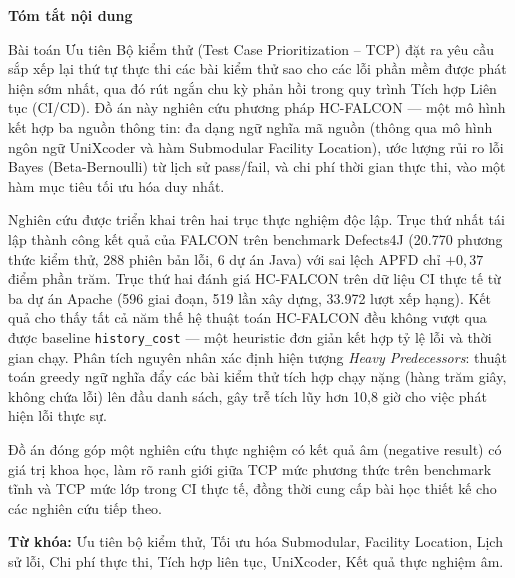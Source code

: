 
\begin{center}
    \Large{\textbf{Tóm tắt nội dung}}
\end{center}
\vspace{0.5cm}

Bài toán Ưu tiên Bộ kiểm thử (Test Case Prioritization -- TCP) đặt ra yêu cầu sắp xếp lại thứ tự thực thi các bài kiểm thử sao cho các lỗi phần mềm được phát hiện sớm nhất, qua đó rút ngắn chu kỳ phản hồi trong quy trình Tích hợp Liên tục (CI/CD). Đồ án này nghiên cứu phương pháp HC-FALCON --- một mô hình kết hợp ba nguồn thông tin: đa dạng ngữ nghĩa mã nguồn (thông qua mô hình ngôn ngữ UniXcoder và hàm Submodular Facility Location), ước lượng rủi ro lỗi Bayes (Beta-Bernoulli) từ lịch sử pass/fail, và chi phí thời gian thực thi, vào một hàm mục tiêu tối ưu hóa duy nhất.

Nghiên cứu được triển khai trên hai trục thực nghiệm độc lập. Trục thứ nhất tái lập thành công kết quả của FALCON trên benchmark Defects4J (20.770 phương thức kiểm thử, 288 phiên bản lỗi, 6 dự án Java) với sai lệch APFD chỉ $+0{,}37$ điểm phần trăm. Trục thứ hai đánh giá HC-FALCON trên dữ liệu CI thực tế từ ba dự án Apache (596 giai đoạn, 519 lần xây dựng, 33.972 lượt xếp hạng). Kết quả cho thấy tất cả năm thế hệ thuật toán HC-FALCON đều không vượt qua được baseline \texttt{history\_cost} --- một heuristic đơn giản kết hợp tỷ lệ lỗi và thời gian chạy. Phân tích nguyên nhân xác định hiện tượng \textit{Heavy Predecessors}: thuật toán greedy ngữ nghĩa đẩy các bài kiểm thử tích hợp chạy nặng (hàng trăm giây, không chứa lỗi) lên đầu danh sách, gây trễ tích lũy hơn 10,8 giờ cho việc phát hiện lỗi thực sự.

Đồ án đóng góp một nghiên cứu thực nghiệm có kết quả âm (negative result) có giá trị khoa học, làm rõ ranh giới giữa TCP mức phương thức trên benchmark tĩnh và TCP mức lớp trong CI thực tế, đồng thời cung cấp bài học thiết kế cho các nghiên cứu tiếp theo.

\medskip

\textbf{Từ khóa:} Ưu tiên bộ kiểm thử, Tối ưu hóa Submodular, Facility Location, Lịch sử lỗi, Chi phí thực thi, Tích hợp liên tục, UniXcoder, Kết quả thực nghiệm âm.

\pagebreak
